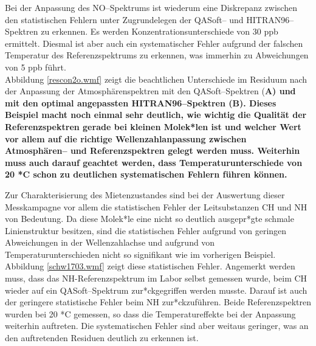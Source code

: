 Bei der Anpassung des NO--Spektrums ist wiederum eine
Diskrepanz zwischen den statistischen Fehlern unter Zugrundelegen
der QASoft-- und HITRAN96--Spektren zu erkennen. Es werden
Konzentrationsunterschiede von 30 ppb ermittelt. Diesmal ist aber
auch ein systematischer Fehler aufgrund der falschen Temperatur
des Referenzspektrums zu erkennen, was immerhin zu Abweichungen
von 5 ppb führt.\\

Abbildung \ref{rescon2o.wmf} zeigt die beachtlichen Unterschiede
im Residuum nach der Anpassung der Atmosphärenspektren mit den
QASoft--Spektren (\bf A\rm) und mit den optimal angepassten
HITRAN96--Spektren (\bf B\rm). Dieses Beispiel macht noch einmal
sehr deutlich, wie wichtig die Qualität der Referenzspektren
gerade bei kleinen Molek*len ist und welcher Wert vor allem auf
die richtige Wellenzahlanpassung zwischen Atmosphären-- und
Referenzspektren gelegt werden muss. Weiterhin muss auch darauf
geachtet werden, dass Temperaturunterschiede von 20 *C schon zu
deutlichen systematischen Fehlern führen können.\\


Zur Charakterisierung des Mietenzustandes sind bei der Auswertung
dieser Messkampagne vor allem die statistischen Fehler der
Leitsubstanzen CH und NH von Bedeutung. Da diese
Molek*le eine nicht so deutlich ausgepr*gte schmale Linienstruktur
besitzen, sind die statistischen Fehler aufgrund von geringen
Abweichungen in der Wellenzahlachse und aufgrund von
Temperaturunterschieden nicht so signifikant wie im vorherigen
Beispiel. Abbildung \ref{schw1703.wmf} zeigt diese statistischen
Fehler. Angemerkt werden muss, dass das
NH-Referenzspektrum im Labor selbst gemessen wurde, beim
CH wieder auf ein QASoft--Spektrum zur*ckgegriffen werden
musste. Darauf ist auch der geringere statistische Fehler beim
NH zur*ckzuführen. Beide Referenzspektren wurden bei 20 *C
gemessen, so dass die Temperatureffekte bei der Anpassung
weiterhin auftreten. Die systematischen Fehler sind aber weitaus
geringer, was an den auftretenden Residuen deutlich zu erkennen
ist.\\

